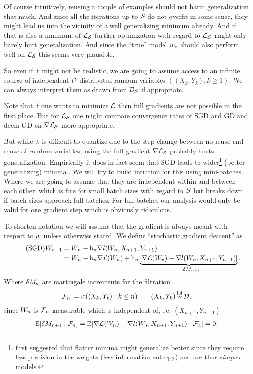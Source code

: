 Of course intuitively, reusing a couple of examples should not harm
generalization that much. And since all the iterations up to \(S\)
do not overfit in some sense, they might lead us into the vicinity of a well
generalizing minimum already. And if that is also a minimum of \(\mathcal{L}_{\mathcal{S}}\)
further optimization with regard to \(\mathcal{L}_{\mathcal{S}}\) might only barely hurt
generalization. And since the ``true'' model \(w_*\) should also perform
well on \(\mathcal{L}_{\mathcal{S}}\) this seems very plausible.

So even if it might not be realistic, we are going to assume access to an infinite
source of independent \(\mathcal{D}\) distributed random variables \(((X_k,Y_k), k\ge 1)\).
We can always interpret them as drawn from \(\mathcal{D}_{\mathcal{S}}\) if appropriate.

Note that if one wants to minimize \(\mathcal{L}\) then full gradients are not possible in
the first place. But for \(\mathcal{L}_{\mathcal{S}}\) one might compare convergence rates
of SGD and GD and deem GD on \(\nabla\mathcal{L}_{\mathcal{S}}\) more appropriate.

But while it
is difficult to quantize due to the step change between no-reuse and reuse of
random variables, using the full gradient \(\nabla\mathcal{L}_{\mathcal{S}}\) probably hurts
generalization. Empirically it does in fact
seem that SGD leads to wider\footnote{
\textcite{hochreiterFlatMinima1997} first suggested that flatter minima might
	generalize better since they require less precision in the weights (less
	information entropy) and are thus \emph{simpler} models.
}
(better generalizing) minima \parencite{liVisualizingLossLandscape2018}.
We will try to build intuition for this using mini-batches. Where we
are going to assume that they are independent within and between each other,
which is fine for small batch sizes with regard to \(S\) but breaks
down if batch sizes approach full batches. For full batches our analysis would
only be valid for one gradient step which is obviously ridiculous.

To shorten notation we will assume that the gradient is always meant
with respect to \(w\) unless otherwise stated.
We define ``stochastic gradient descent'' as
%
\begin{align}
	\tag{SGD}
	W_{n+1}
	&= W_n - \text{h}_n\nabla l(W_n, X_{n+1},Y_{n+1})\\
	\nonumber
	&= W_n - \text{h}_n\nabla\mathcal{L}(W_n)
	+ \text{h}_n\underbrace{
		[\nabla\mathcal{L}(W_n) - \nabla l(W_n, X_{n+1}, Y_{n+1})]
	}_{=:\delta M_{n+1}}.
\end{align}
Where \(\delta M_n\) are martingale increments for the filtration
\begin{align*}
	\filtration_n :=\sigma((X_k, Y_k): k\le n )
	\qquad (X_k,Y_k)\stackrel{\text{iid}}{\sim}\dist,
\end{align*}
since \(W_n\) is \(\mathcal{F}_n\)-measurable which is independent of, i.e.
\((X_{n+1},Y_{n+1})\)
\begin{align}\label{eq: conditional independence of martingale increments}
	\mathbb{E}[\delta M_{n+1}\mid \mathcal{F}_n]
	= \mathbb{E}[\nabla\mathcal{L}(W_n) - \nabla l(W_n, X_{n+1}, Y_{n+1})\mid \mathcal{F}_n]
	= 0.
\end{align}
%
